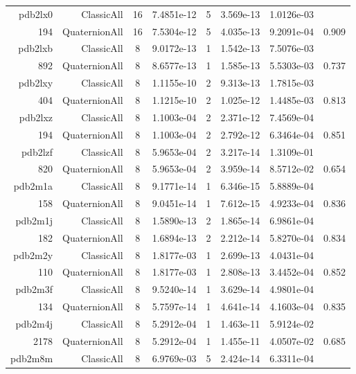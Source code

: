 \begin{xltabular}{\textwidth}{r|rcS[table-format=1.4e+2]cS[table-format=1.3e+2]S[table-format=1.4e+2]S[table-format=-1.3]}
pdb2lx0 & ClassicAll & 16 & 7.4851e-12 & 5 & 3.569e-13 & 1.0126e-03 & \\
194 & QuaternionAll & 16 & 7.5304e-12 & 5 & 4.035e-13 & 9.2091e-04 & 0.909\\  \addlinespace
pdb2lxb & ClassicAll & 8 & 9.0172e-13 & 1 & 1.542e-13 & 7.5076e-03 & \\
892 & QuaternionAll & 8 & 8.6577e-13 & 1 & 1.585e-13 & 5.5303e-03 & 0.737\\  \addlinespace
pdb2lxy & ClassicAll & 8 & 1.1155e-10 & 2 & 9.313e-13 & 1.7815e-03 & \\
404 & QuaternionAll & 8 & 1.1215e-10 & 2 & 1.025e-12 & 1.4485e-03 & 0.813\\  \addlinespace
pdb2lxz & ClassicAll & 8 & 1.1003e-04 & 2 & 2.371e-12 & 7.4569e-04 & \\
194 & QuaternionAll & 8 & 1.1003e-04 & 2 & 2.792e-12 & 6.3464e-04 & 0.851\\  \addlinespace
{\color{red} pdb2lzf } & ClassicAll & 8 & 5.9653e-04 & 2 & 3.217e-14 & 1.3109e-01 & \\
820 & QuaternionAll & 8 & 5.9653e-04 & 2 & 3.959e-14 & 8.5712e-02 & 0.654\\  \addlinespace
pdb2m1a & ClassicAll & 8 & 9.1771e-14 & 1 & 6.346e-15 & 5.8889e-04 & \\
158 & QuaternionAll & 8 & 9.0451e-14 & 1 & 7.612e-15 & 4.9233e-04 & 0.836\\  \addlinespace
pdb2m1j & ClassicAll & 8 & 1.5890e-13 & 2 & 1.865e-14 & 6.9861e-04 & \\
182 & QuaternionAll & 8 & 1.6894e-13 & 2 & 2.212e-14 & 5.8270e-04 & 0.834\\  \addlinespace
pdb2m2y & ClassicAll & 8 & 1.8177e-03 & 1 & 2.699e-13 & 4.0431e-04 & \\
110 & QuaternionAll & 8 & 1.8177e-03 & 1 & 2.808e-13 & 3.4452e-04 & 0.852\\  \addlinespace
pdb2m3f & ClassicAll & 8 & 9.5240e-14 & 1 & 3.629e-14 & 4.9801e-04 & \\
134 & QuaternionAll & 8 & 5.7597e-14 & 1 & 4.641e-14 & 4.1603e-04 & 0.835\\  \addlinespace
{\color{red} pdb2m4j } & ClassicAll & 8 & 5.2912e-04 & 1 & 1.463e-11 & 5.9124e-02 & \\
2178 & QuaternionAll & 8 & 5.2912e-04 & 1 & 1.455e-11 & 4.0507e-02 & 0.685\\  \addlinespace
pdb2m8m & ClassicAll & 8 & 6.9769e-03 & 5 & 2.424e-14 & 6.3311e-04 & \\

\end{xltabular}
